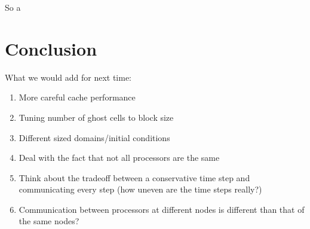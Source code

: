 \documentclass{article}
\begin{document}
So a







\section{Conclusion}
What we would add for next time:
\begin{enumerate}
	\item More careful cache performance
	\item Tuning number of ghost cells to block size
	\item Different sized domains/initial conditions
	\item Deal with the fact that not all processors are the same
	\item Think about the tradeoff between a conservative time step and communicating every step (how uneven are the time steps really?)
	\item Communication between processors at different nodes is different than that of the same nodes?
\end{enumerate}

\appendix
\end{document}
